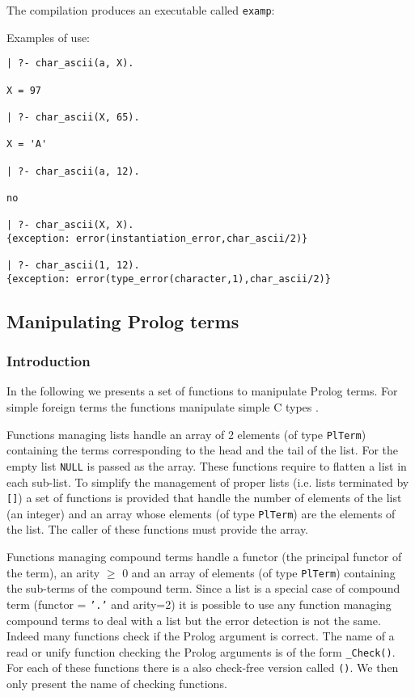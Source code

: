 The compilation produces an executable called \texttt{examp}:


Examples of use:

\begin{Indentation}
\begin{verbatim}
| ?- char_ascii(a, X).

X = 97

| ?- char_ascii(X, 65).

X = 'A'

| ?- char_ascii(a, 12).

no

| ?- char_ascii(X, X).
{exception: error(instantiation_error,char_ascii/2)}

| ?- char_ascii(1, 12).
{exception: error(type_error(character,1),char_ascii/2)}
\end{verbatim}
\end{Indentation}

\subsection{Manipulating Prolog terms}
\label{Manipulating-Prolog-terms}

\subsubsection{Introduction}
\label{Introduction:(Manipulating-Prolog-terms)}
In the following we presents a set of functions to manipulate Prolog terms.
For simple foreign terms the functions manipulate simple C types
.

Functions managing lists handle an array of 2 elements (of type
\texttt{PlTerm}) containing the terms corresponding to the head and the tail
of the list. For the empty list \texttt{NULL} is passed as the array. These
functions require to flatten a list in each sub-list. To simplify the
management of proper lists (i.e. lists terminated by \texttt{[]}) a set of
functions is provided that handle the number of elements of the list (an
integer) and an array whose elements (of type \texttt{PlTerm}) are the
elements of the list. The caller of these functions must provide the array.

Functions managing compound terms handle a functor (the principal functor of
the term), an arity  $\geq$ 0 and an array of  elements
(of type \texttt{PlTerm}) containing the sub-terms of the compound term.
Since a list is a special case of compound term (functor = \texttt{'.'} and
arity=2) it is possible to use any function managing compound terms to deal
with a list but the error detection is not the same. Indeed many functions
check if the Prolog argument is correct. The name of a read or unify
function checking the Prolog arguments is of the form
\texttt{\_Check()}. For each of these functions there is a also
check-free version called \texttt{()}. We then only present the
name of checking functions.

